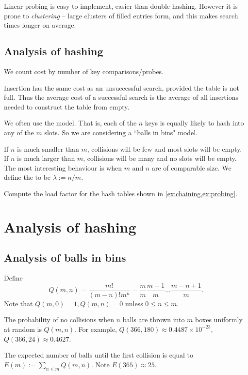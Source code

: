 Linear probing is easy to implement, easier than double hashing.
However it is prone to \emph{clustering} -- large clusters of filled entries form, 
and this makes search times longer on average.

\section{Analysis of hashing}
We count cost by number of key comparisons/probes.

Insertion has the same cost as an unsuccessful search, provided the table is not full.
Thus the average cost of a successful search is the average of all insertions needed to construct the table from empty.

We often use the  model. 
That is, each of the $n$ keys is equally likely to hash into any of the $m$ slots. 
So we are considering a ``balls in bins" model.

If $n$ is much smaller than $m$, collisions will be few and most slots will be empty. 
If $n$ is much larger than $m$, collisions will be many and no slots will be empty. 
The most interesting behaviour is when $m$ and $n$ are of comparable size. 
We define the  to be $\lambda := n/m$. 

\begin{Boxample}[4]
Compute the load factor for the hash tables shown in \cref{ex:chaining,ex:probing}.
\end{Boxample}


\chapter{Analysis of hashing} %

\section{Analysis of balls in bins}
Define 
$$Q(m, n) = \frac{m!}{(m-n)! m^n} = \frac{m}{m} \frac{m-1}{m} \dots 
\frac{m - n + 1}{m}\text{.}$$
Note that $Q(m,0) = 1, Q(m, n) = 0$ unless $0 \leq n \leq m$.

The probability of no collisions when $n$ balls are thrown into $m$ boxes 
uniformly at random is $Q(m, n)$. For example, $Q(366, 180) \approx 0.4487
 \times 10^{-23}$, $Q(366, 24) \approx  0.4627$. 

The expected number of balls until the first collision is equal to 
$E(m):=\sum_{n \leq m} Q(m, n)$. Note $E(365) \approx 25$.


